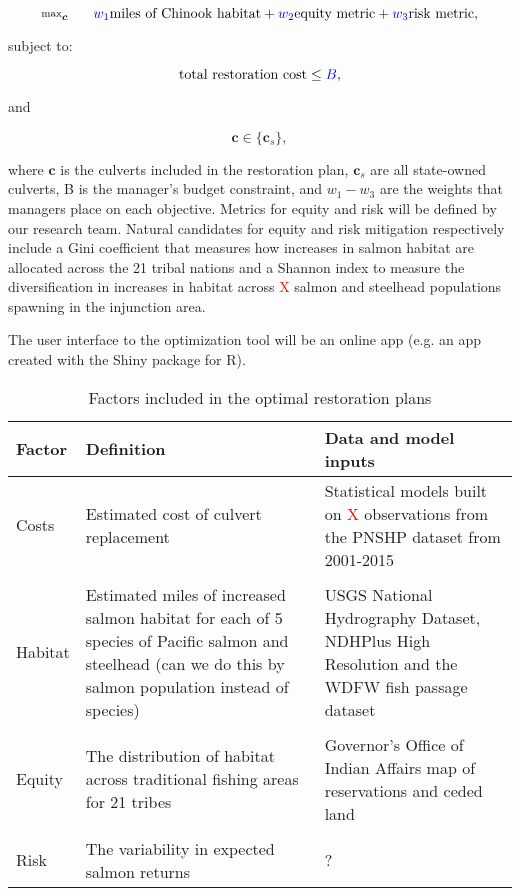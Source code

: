 \documentclass[12pt]{elsarticle}
\begin{document}
\begin{equation*}
\substack{\text{max}}_{\boldsymbol{c}}\hspace{0.25in} \textcolor{blue}{w_1} \text{miles of Chinook habitat} + \textcolor{blue}{w_2} \text{equity metric} + \textcolor{blue}{w_3} \text{risk metric},
\end{equation*}

\noindent subject to:

\begin{equation*}
\text{total restoration cost} \le \textcolor{blue}{B},
\end{equation*}

\noindent and

\begin{equation*}
\boldsymbol{c} \in \{\boldsymbol{c}_s  \},
\end{equation*}

where $\boldsymbol{c}$ is the culverts included in the restoration plan, $\boldsymbol{c}_s$ are all state-owned culverts, B is the manager's budget constraint, and $w_1-w_3$ are the weights that managers place on each objective. Metrics for equity and risk will be defined by our research team. Natural candidates for equity and risk mitigation respectively include a Gini coefficient that measures how increases in salmon habitat are allocated across the 21 tribal nations and a Shannon index to measure the diversification in increases in habitat across \textcolor{red}{X} salmon and steelhead populations spawning in the injunction area.

The user interface to the optimization tool will be an online app (e.g. an app created with the Shiny package for R).


\begin{table}[htbp]
  \centering
  \caption{Factors included in the optimal restoration plans}
    \begin{tabular}{llp{18.835em}}\hline
    \textbf{Factor} & \textbf{Definition} & \multicolumn{1}{l}{\textbf{Data and model inputs}} \\\hline
    Costs & Estimated cost of culvert replacement & Statistical models built on \textcolor{red}{X} observations from the PNSHP dataset from 2001-2015 \\
& &\\
    Habitat & \multicolumn{1}{p{17.335em}}{Estimated miles of increased salmon habitat for each of 5 species of Pacific salmon and steelhead (can we do this by salmon population instead of species)} & USGS National Hydrography Dataset, NDHPlus High Resolution and the WDFW fish passage dataset \\
& &\\
    Equity & \multicolumn{1}{p{17.335em}}{The distribution of habitat across traditional fishing areas for 21 tribes} & Governor's Office of Indian Affairs map of reservations and ceded land \\
& &\\
    Risk  & The variability in expected salmon returns & ? \\\hline
    \end{tabular}%
  \label{tab:factors}%
\end{table}%
\end{document}
